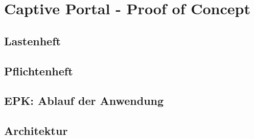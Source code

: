\section{Captive Portal - Proof of Concept}

\subsection{Lastenheft}

\subsection{Pflichtenheft}

\subsection{EPK: Ablauf der Anwendung}

\subsection{Architektur}
